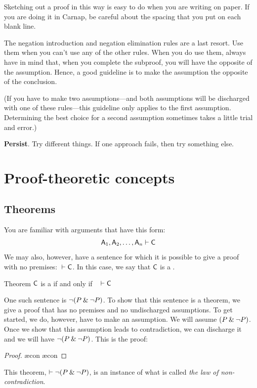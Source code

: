 \begin{earg}
Sketching out a proof in this way is easy to do when you are writing on paper. If you are doing it in Carnap, be careful about the spacing that you put on each blank line.

\medskip

\item[\ex{18-7}] The negation introduction and negation elimination rules are a last resort. Use them when you can't use any of the other rules. When you do use them, always have in mind that, when you complete the subproof, you will have the opposite of the assumption. Hence, a good guideline is to make the assumption the opposite of the conclusion. 

(If you have to make two assumptions---and both assumptions will be discharged with one of these rules---this guideline only applies to the first assumption. Determining the best choice for a second assumption sometimes takes a little trial and error.)  
\medskip

\item[\ex{18-8}] \textbf{Persist}. Try different things. If one approach fails, then try something else.
\end{earg}




\chapter{Proof-theoretic concepts}\label{s:ProofTheoreticConcepts}

\section{Theorems}\label{s:theorems}

You are familiar with arguments that have this form:
$$\mathsf{A}_1, \mathsf{A}_2, \ldots, \mathsf{A}_n \vdash \mathsf{C}$$
We may also, however, have a sentence for which it is possible to give a proof with no premises: ${} \vdash \mathsf{C}$. In this case, we say that $\mathsf{C}$ is a .

\begin{factboxy}{Theorem}\label{def:syntactic_tautology_in_sl}
$\mathsf{C}$ is a  if and only if ~ $\vdash \mathsf{C}$
\end{factboxy}

One such sentence is ${\neg} (P \mathbin{\&} {\neg} P)$. To show that this sentence is a theorem, we give a proof that has no premises and no undischarged assumptions. To get started, we do, however, have to make an assumption. We will assume $(P \mathbin{\&} {\neg} P)$. Once we show that this assumption leads to contradiction, we can discharge it and we will have ${\neg} (P \mathbin{\&} {\neg} P)$. This is the proof:
	\begin{proof}
		\open
			 \as{}
			\ae{con}
			\ae{con}
		\close
	\end{proof}
This theorem, $\vdash {\neg} (P \mathbin{\&} {\neg} P)$, is an instance of what is called \emph{the law of non-contradiction}.

